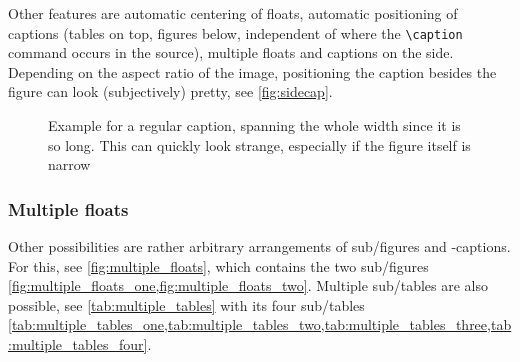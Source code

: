 \begin{description}
        Other features are automatic centering of floats, automatic positioning
        of captions (tables on top, figures below, independent of where the
        \verb|\caption| command occurs in the source), multiple floats and
        captions on the side.
        Depending on the aspect ratio of the image, positioning the caption besides
        the figure can look (subjectively) pretty, see \cref{fig:sidecap}.
\end{description}

\begin{figure}\ContinuedFloat*%
    \caption{%
        Example for a regular caption,
        spanning the whole width since it is so long.
        This can quickly look strange, especially if the figure itself is narrow%
    }%
    \label{fig:wide_caption}%
\end{figure}

\begin{figure}\ContinuedFloat
\end{figure}

\subsubsection{Multiple floats}

Other possibilities are rather arbitrary arrangements of sub\-/figures and -captions.
For this, see \cref{fig:multiple_floats}, which contains the two sub\-/figures
\cref{fig:multiple_floats_one,fig:multiple_floats_two}.
Multiple sub\-/tables are also possible, see \cref{tab:multiple_tables} with its four
sub\-/tables
\cref{tab:multiple_tables_one,tab:multiple_tables_two,tab:multiple_tables_three,tab:multiple_tables_four}.

